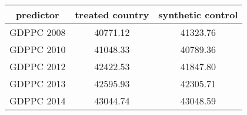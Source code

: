 \begin{tabular}{c|c|c}
predictor&\textbf{treated country}&\textbf{synthetic control}\\
\hline 
GDPPC 2008 & 40771.12 & 41323.76\\
GDPPC 2010 & 41048.33 & 40789.36\\
GDPPC 2012 & 42422.53 & 41847.80\\
GDPPC 2013 & 42595.93 & 42305.71\\
GDPPC 2014 & 43044.74 & 43048.59\\
\hline
\end{tabular}
